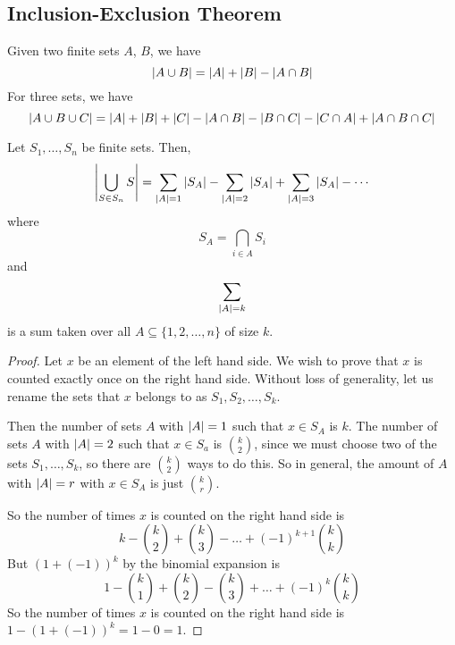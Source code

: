 \subsection{Inclusion-Exclusion Theorem}
Given two finite sets \(A\), \(B\), we have
\[
	\abs{A \cup B} = \abs{A} + \abs{B} - \abs{A \cap B}
\]
For three sets, we have
\[
	\abs{A \cup B \cup C} = \abs{A} + \abs{B} + \abs{C} - \abs{A \cap B} - \abs{B \cap C} - \abs{C \cap A} + \abs{A \cap B \cap C}
\]
\begin{theorem}
	Let \(S_1, \dots, S_n\) be finite sets.
	Then,
	\[
		\abs{\bigcup_{S \in S_n} S} = \sum_{\abs{A} = 1}\abs{S_A} - \sum_{\abs{A} = 2}\abs{S_A} + \sum_{\abs{A} = 3}\abs{S_A} - \cdots
	\]
	where
	\[
		S_A = \bigcap_{i \in A}S_i
	\]
	and
	\[
		\sum_{\abs{A} = k}
	\]
	is a sum taken over all \(A \subseteq \{ 1, 2, \dots, n \}\) of size \(k\).
\end{theorem}
\begin{proof}
	Let \(x\) be an element of the left hand side.
	We wish to prove that \(x\) is counted exactly once on the right hand side.
	Without loss of generality, let us rename the sets that \(x\) belongs to as \(S_1, S_2, \dots, S_k\).
	
	Then the number of sets \(A\) with \(\abs{A} = 1\) such that \(x \in S_A\) is \(k\).
	The number of sets \(A\) with \(\abs{A} = 2\) such that \(x \in S_a\) is \(\binom{k}{2}\), since we must choose two of the sets \(S_1, \dots, S_k\), so there are \(\binom{k}{2}\) ways to do this.
	So in general, the amount of \(A\) with \(\abs{A} = r\) with \(x \in S_A\) is just \(\binom{k}{r}\).
	
	So the number of times \(x\) is counted on the right hand side is
	\[
		k - \binom{k}{2} + \binom{k}{3} - \dots + (-1)^{k+1}\binom{k}{k}
	\]
	But \((1 + (-1))^k\) by the binomial expansion is
	\[
		1 - \binom{k}{1} + \binom{k}{2} - \binom{k}{3} + \dots + (-1)^k\binom{k}{k}
	\]
	So the number of times \(x\) is counted on the right hand side is \(1 - (1 + (-1))^k = 1 - 0 = 1\).
\end{proof}


